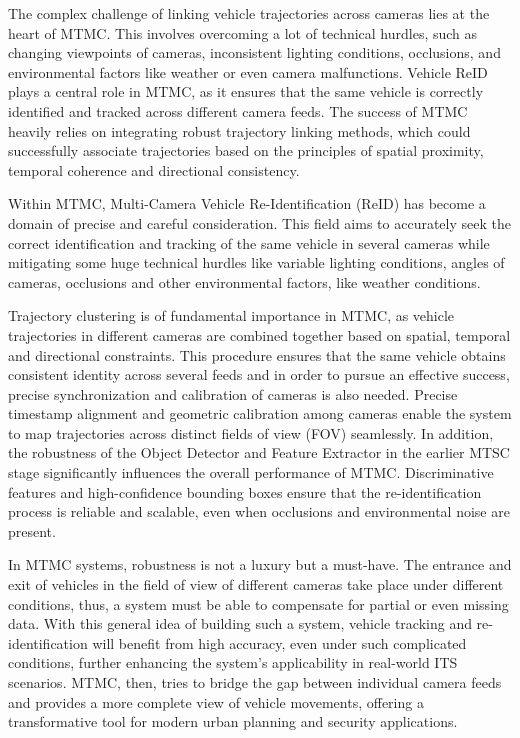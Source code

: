 The complex challenge of linking vehicle trajectories across cameras lies at the heart of MTMC. This involves overcoming a lot of technical hurdles, such as changing viewpoints of cameras, inconsistent lighting conditions, occlusions, and environmental factors like weather or even camera malfunctions. Vehicle ReID plays a central role in MTMC, as it ensures that the same vehicle is correctly identified and tracked across different camera feeds. The success of MTMC heavily relies on integrating robust trajectory linking methods, which could successfully associate trajectories based on the principles of spatial proximity, temporal coherence and directional consistency.

Within MTMC, Multi-Camera Vehicle Re-Identification (ReID) has become a domain of precise and careful consideration. This field aims to accurately seek the correct identification and tracking of the same vehicle in several cameras while mitigating some huge technical hurdles like variable lighting conditions, angles of cameras, occlusions and other environmental factors, like weather conditions.

Trajectory clustering \cite{MTMCTrajectoryBased1} is of fundamental importance in MTMC, as vehicle trajectories in different cameras are combined together based on spatial, temporal and directional constraints. This procedure ensures that the same vehicle obtains consistent identity across several feeds and in order to pursue an effective success, precise synchronization and calibration of cameras is also needed. Precise timestamp alignment and geometric calibration among cameras enable the system to map trajectories across distinct fields of view (FOV) seamlessly. In addition, the robustness of the Object Detector and Feature Extractor in the earlier MTSC stage significantly influences the overall performance of MTMC. Discriminative features and high-confidence bounding boxes ensure that the re-identification process is reliable and scalable, even when occlusions and environmental noise are present.

In MTMC systems, robustness is not a luxury but a must-have. The entrance and exit of vehicles in the field of view of different cameras take place under different conditions, thus, a system must be able to compensate for partial or even missing data. With this general idea of building such a system, vehicle tracking and re-identification will benefit from high accuracy, even under such complicated conditions, further enhancing the system's applicability in real-world ITS scenarios. MTMC, then, tries to bridge the gap between individual camera feeds and provides a more complete view of vehicle movements, offering a transformative tool for modern urban planning and security applications.

